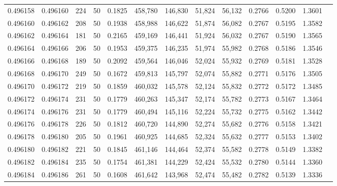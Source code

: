 \begin{tabular}{rrrrrrrrrrrrr}
0.496158 & 0.496160 &   224 &  50 &                                     0.1825 & 458,780 & 146,830 &  51,824 &  56,132 & 0.2766 & 0.5200 & 1.3601 \\
0.496160 & 0.496162 &   208 &  50 &                                     0.1938 & 458,988 & 146,622 &  51,874 &  56,082 & 0.2767 & 0.5195 & 1.3582 \\
0.496162 & 0.496164 &   181 &  50 &                                     0.2165 & 459,169 & 146,441 &  51,924 &  56,032 & 0.2767 & 0.5190 & 1.3565 \\
0.496164 & 0.496166 &   206 &  50 &                                     0.1953 & 459,375 & 146,235 &  51,974 &  55,982 & 0.2768 & 0.5186 & 1.3546 \\
0.496166 & 0.496168 &   189 &  50 &                                     0.2092 & 459,564 & 146,046 &  52,024 &  55,932 & 0.2769 & 0.5181 & 1.3528 \\
0.496168 & 0.496170 &   249 &  50 &                                     0.1672 & 459,813 & 145,797 &  52,074 &  55,882 & 0.2771 & 0.5176 & 1.3505 \\
0.496170 & 0.496172 &   219 &  50 &                                     0.1859 & 460,032 & 145,578 &  52,124 &  55,832 & 0.2772 & 0.5172 & 1.3485 \\
0.496172 & 0.496174 &   231 &  50 &                                     0.1779 & 460,263 & 145,347 &  52,174 &  55,782 & 0.2773 & 0.5167 & 1.3464 \\
0.496174 & 0.496176 &   231 &  50 &                                     0.1779 & 460,494 & 145,116 &  52,224 &  55,732 & 0.2775 & 0.5162 & 1.3442 \\
0.496176 & 0.496178 &   226 &  50 &                                     0.1812 & 460,720 & 144,890 &  52,274 &  55,682 & 0.2776 & 0.5158 & 1.3421 \\
0.496178 & 0.496180 &   205 &  50 &                                     0.1961 & 460,925 & 144,685 &  52,324 &  55,632 & 0.2777 & 0.5153 & 1.3402 \\
0.496180 & 0.496182 &   221 &  50 &                                     0.1845 & 461,146 & 144,464 &  52,374 &  55,582 & 0.2778 & 0.5149 & 1.3382 \\
0.496182 & 0.496184 &   235 &  50 &                                     0.1754 & 461,381 & 144,229 &  52,424 &  55,532 & 0.2780 & 0.5144 & 1.3360 \\
0.496184 & 0.496186 &   261 &  50 &                                     0.1608 & 461,642 & 143,968 &  52,474 &  55,482 & 0.2782 & 0.5139 & 1.3336 \\

\end{tabular}

